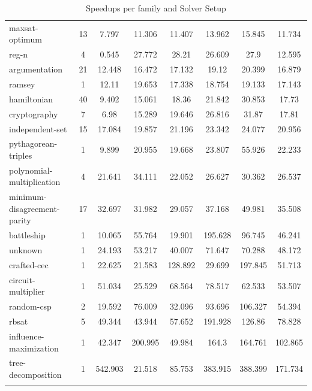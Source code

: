 \documentclass[12pt,a4paper,twoside]{scrartcl}
\numberwithin{equation}{section}
\begin{document}
\begin{longtable}{ lccccccc }
  maxsat-optimum	&	13	&	7.797	&	11.306	&	11.407	&	13.962	&	15.845	&	11.734\\
  reg-n	&	4	&	0.545	&	27.772	&	28.21	&	26.609	&	27.9	&	12.595\\
  argumentation	&	21	&	12.448	&	16.472	&	17.132	&	19.12	&	20.399	&	16.879\\
  ramsey	&	1	&	12.11	&	19.653	&	17.338	&	18.754	&	19.133	&	17.143\\
  hamiltonian	&	40	&	9.402	&	15.061	&	18.36	&	21.842	&	30.853	&	17.73\\
  cryptography	&	7	&	6.98	&	15.289	&	19.646	&	26.816	&	31.87	&	17.81\\
  independent-set	&	15	&	17.084	&	19.857	&	21.196	&	23.342	&	24.077	&	20.956\\
  pythagorean-triples	&	1	&	9.899	&	20.955	&	19.668	&	23.807	&	55.926	&	22.233\\
  polynomial-multiplication	&	4	&	21.641	&	34.111	&	22.052	&	26.627	&	30.362	&	26.537\\
  minimum-disagreement-parity	&	17	&	32.697	&	31.982	&	29.057	&	37.168	&	49.981	&	35.508\\
  battleship	&	1	&	10.065	&	55.764	&	19.901	&	195.628	&	96.745	&	46.241\\
  unknown	&	1	&	24.193	&	53.217	&	40.007	&	71.647	&	70.288	&	48.172\\
  crafted-cec	&	1	&	22.625	&	21.583	&	128.892	&	29.699	&	197.845	&	51.713\\
  circuit-multiplier	&	1	&	51.034	&	25.529	&	68.564	&	78.517	&	62.533	&	53.507\\
  random-csp	&	2	&	19.592	&	76.009	&	32.096	&	93.696	&	106.327	&	54.394\\
  rbsat	&	5	&	49.344	&	43.944	&	57.652	&	191.928	&	126.86	&	78.828\\
  influence-maximization	&	1	&	42.347	&	200.995	&	49.984	&	164.3	&	164.761	&	102.865\\
  tree-decomposition	&	1	&	542.903	&	21.518	&	85.753	&	383.915	&	388.399	&	171.734\\
  \bottomrule
  \caption{Speedups per family and Solver Setup}
  \label{tab:speedupsFamiliesComplete}
\end{longtable}



\end{document}
